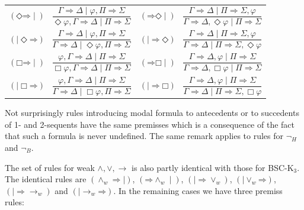\documentclass[10pt,a4paper]{article}
\theoremstyle{definition}
\newcommand{\3}{\vspace{.3in}}
\newcommand{\2}{\vspace{.2in}}
\newcommand{\1}{\vspace{.1in}}
\newcommand{\5}{\vspace{.05in}}
\begin{document}
\1

\noindent\begin{tabular}{ll}

	$(\mathord{\Diamond}\mathord{\Rightarrow}\mid)$ \ $\dfrac{\Gamma
		\Rightarrow \Delta \mid \varphi, \Pi\Rightarrow\Sigma}{\Diamond \varphi, \Gamma \Rightarrow \Delta \mid \Pi\Rightarrow\Sigma}$ &
	$(\mathord{\Rightarrow}\mathord{\Diamond}\mid)$ \ $\dfrac{\Gamma
		\Rightarrow \Delta \mid \Pi\Rightarrow\Sigma, \varphi}{\Gamma
		\Rightarrow \Delta, \Diamond\varphi\mid \Pi\Rightarrow\Sigma}$\\[16pt]
	
	
	$(\mathord{\mid\Diamond}\mathord{\Rightarrow})$ \ $\dfrac{\Gamma
		\Rightarrow \Delta \mid \varphi, \Pi\Rightarrow\Sigma}{\Gamma
		\Rightarrow \Delta \mid \Diamond\varphi, \Pi\Rightarrow\Sigma}$ &
	$(\mathord{\mid\Rightarrow}\mathord{\Diamond})$ \ $\dfrac{\Gamma
		\Rightarrow \Delta \mid \Pi\Rightarrow\Sigma, \varphi}{\Gamma
		\Rightarrow \Delta \mid \Pi\Rightarrow\Sigma, \Diamond\varphi}$\\[16pt]
	
	$(\mathord{\Box}\mathord{\Rightarrow}\mid)$ \ $\dfrac{\varphi, \Gamma
		\Rightarrow \Delta \mid \Pi\Rightarrow\Sigma}{\Box\varphi, \Gamma \Rightarrow \Delta \mid \Pi\Rightarrow\Sigma}$ &
	$(\mathord{\Rightarrow}\mathord{\Box}\mid)$ \ $\dfrac{\Gamma
		\Rightarrow \Delta, \varphi \mid \Pi\Rightarrow\Sigma}{\Gamma
		\Rightarrow \Delta, \Box\varphi\mid \Pi\Rightarrow\Sigma}$\\[16pt]
	
	
	$(\mathord{\mid\Box}\mathord{\Rightarrow})$ \ $\dfrac{\varphi, \Gamma
		\Rightarrow \Delta \mid \Pi\Rightarrow\Sigma}{\Gamma
		\Rightarrow \Delta \mid \Box\varphi, \Pi\Rightarrow\Sigma}$ &
	$(\mathord{\mid\Rightarrow}\mathord{\Box})$ \ $\dfrac{\Gamma
		\Rightarrow \Delta, \varphi \mid \Pi\Rightarrow\Sigma}{\Gamma
		\Rightarrow \Delta \mid \Pi\Rightarrow\Sigma, \Box\varphi}$\\[16pt]
	
	
	
	
\end{tabular}	


Not surprisingly rules introducing modal formula to antecedents or to succedents of 1- and 2-sequents have the same premisses which is a consequence of the fact that such a formula is never undefined. The same remark applies to rules for $\neg_H$ and $\neg_B$.

\1

The set of rules for weak $\wedge, \vee, \rightarrow$ is also partly identical with those for BSC-K$_3$. The identical rules are $(\mathord{\wedge_w}\mathord{\Rightarrow\mid})$, $(\mathord{\Rightarrow}\mathord{\wedge_w\mid})$, $(\mathord{\mid\Rightarrow}\mathord{\vee_w})$, $(\mathord{\mid\vee_w}\mathord{\Rightarrow})$, $(\mathord{\mid\Rightarrow}\mathord{\rightarrow_w})$ and $(\mathord{\mid\rightarrow_w}\mathord{\Rightarrow})$. In the remaining cases we have three premiss rules:
\end{document}
